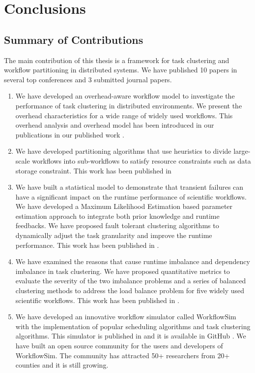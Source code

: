 \chapter{Conclusions}

\section{Summary of Contributions}


The main contribution of this thesis is a framework for task clustering and workflow partitioning in distributed systems. We have published 10 papers in several top conferences and 3 submitted journal papers. 
\begin{enumerate}
\item We have developed an overhead-aware workflow model to investigate the performance of task clustering in distributed environments. We present the overhead characteristics for a wide range of widely used workflows. This overhead analysis and overhead model has been introduced in our publications in our published work \cite{Chen2013a, Chen2011, Chen2013b}. 
\item We have developed partitioning algorithms that use heuristics to divide large-scale workflows into sub-workflows to satisfy resource constraints such as data storage constraint. This work has been published in \cite{Chen2011a, Integration2012}
\item We have built a statistical model to demonstrate that transient failures can have a significant impact on the runtime performance of scientific workflows. We have developed a Maximum Likelihood Estimation based parameter estimation approach to integrate both prior knowledge and runtime feedbacks. We have proposed fault tolerant clustering algorithms to dynamically adjust the task granularity and improve the runtime performance. This work has been published in \cite{Chen2012}. 
\item We have examined the reasons that cause runtime imbalance and dependency imbalance in task clustering. We have proposed quantitative metrics to evaluate the severity of the two imbalance problems and a series of balanced clustering methods to address the load balance problem for five widely used scientific workflows. This work has been published in \cite{Chen2013a, Chen2013b}. 
\item We have developed an innovative workflow simulator called WorkflowSim with the implementation of popular scheduling algorithms and task clustering algorithms. This simulator is published in \cite{WorkflowSim} and it is available in GitHub \cite{WorkflowSim-Github}. 
We have built an open source community for the users and developers of WorkflowSim. The community has attracted 50+ researchers from 20+ counties and it is still growing. 
\end{enumerate}



